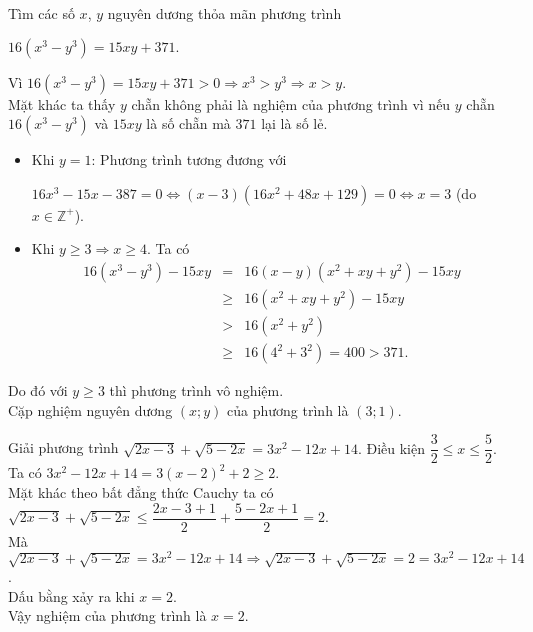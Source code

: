 \begin{ex}%
	Tìm các số $x$, $y$ nguyên dương thỏa mãn phương trình
	\begin{center}
		$16(x^3-y^3)=15xy+371.$
	\end{center}
	\loigiai
	{	Vì $16(x^3-y^3)=15xy+371>0\Rightarrow x^3>y^3\Rightarrow x>y.$\\
		Mặt khác ta thấy $y$ chẵn không phải là nghiệm của phương trình vì nếu $y$ chẵn $16(x^3-y^3)$ và $15xy$ là số chẵn mà $371$ lại là số lẻ.
		\begin{itemize}
			\item Khi $y=1$: Phương trình tương đương với 
			\begin{center}
				$16x^3-15x-387=0\Leftrightarrow (x-3)(16x^2+48x+129)=0\Leftrightarrow x=3$ (do $x\in \mathbb{Z^+}$).
			\end{center}
			\item Khi $y\ge 3\Rightarrow x\ge 4$. Ta có
			\begin{eqnarray*}
				16(x^3-y^3)-15xy&=&16(x-y)(x^2+xy+y^2)-15xy\\
				&\ge& 16(x^2+xy+y^2)-15xy\\
				&>& 16(x^2+y^2)\\
				&\ge& 16(4^2+3^2)=400>371.
			\end{eqnarray*} 
		\end{itemize}
		Do đó với $y\ge 3$ thì phương trình vô nghiệm.\\
		Cặp nghiệm nguyên dương $(x;y)$ của phương trình là $(3;1).$
	}
\end{ex}

\begin{ex}%
	Giải phương trình $\sqrt{2x-3}+\sqrt{5-2x}=3x^2-12x+14.$
	\loigiai
	{
		Điều kiện $\dfrac{3}{2}\le x\le \dfrac{5}{2}.$\\
		Ta có $3x^2-12x+14=3(x-2)^2+2\ge 2.$\\
		Mặt khác theo bất đẳng thức Cauchy ta có $\sqrt{2x-3}+\sqrt{5-2x}\le \dfrac{2x-3+1}{2}+\dfrac{5-2x+1}{2}=2.$\\
		Mà $\sqrt{2x-3}+\sqrt{5-2x}=3x^2-12x+14\Rightarrow \sqrt{2x-3}+\sqrt{5-2x}=2=3x^2-12x+14$.\\
		Dấu bằng xảy ra khi $x=2.$\\
		Vậy nghiệm của phương trình là $x=2$.
	}
\end{ex}

